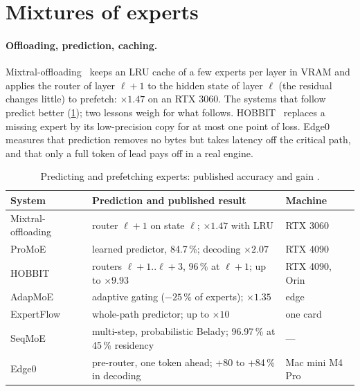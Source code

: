 \section{Mixtures of experts}\label{sec:moe-systemes}

\paragraph{Offloading, prediction, caching.} Mixtral-offloading~\cite{mixtraloffload2023} keeps an LRU cache of a few experts per layer in VRAM and applies the router of layer $\ell+1$ to the hidden state of layer $\ell$ (the residual changes little) to prefetch: $\times 1.47$ on an RTX 3060. The systems that follow predict better (\cref{tab:prediction}); two lessons weigh for what follows. HOBBIT~\cite{hobbit2024} replaces a missing expert by its low-precision copy for at most one point of loss. Edge0~\cite{edge0_2026} measures that prediction removes no bytes but takes latency off the critical path, and that only a full token of lead pays off in a real engine.

\begin{table}[ht]
\centering\small
\caption[Predicting and prefetching experts]{Predicting and prefetching experts: published accuracy and gain \litt.}
\label{tab:prediction}
\begin{tabularx}{\linewidth}{@{}lXl@{}}
\toprule
System & Prediction and published result & Machine \\
\midrule
Mixtral-offloading~\cite{mixtraloffload2023} & router $\ell{+}1$ on state $\ell$; $\times1.47$ with LRU & RTX 3060 \\
ProMoE~\cite{promoe2024} & learned predictor, 84.7\,\%; decoding $\times2.07$ & RTX 4090 \\
HOBBIT~\cite{hobbit2024} & routers $\ell{+}1..\ell{+}3$, 96\,\% at $\ell{+}1$; up to $\times9.93$ & RTX 4090, Orin \\
AdapMoE~\cite{adapmoe2024} & adaptive gating ($-25$\,\% of experts); $\times1.35$ & edge \\
ExpertFlow~\cite{expertflow2024} & whole-path predictor; up to $\times10$ & one card \\
SeqMoE~\cite{seqmoe2026} & multi-step, probabilistic Belady; 96.97\,\% at 45\,\% residency & --- \\
Edge0~\cite{edge0_2026} & pre-router, one token ahead; +80 to +84\,\% in decoding & Mac mini M4 Pro \\
\bottomrule
\end{tabularx}
\end{table}

